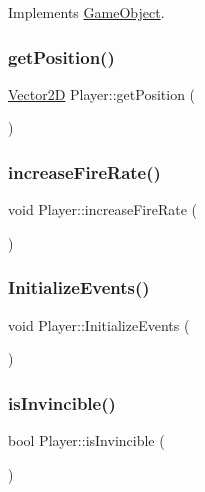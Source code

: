 Implements \hyperlink{class_game_object_a8a3c07e92775fe00baa9e661fefb224e}{Game\+Object}.

\hypertarget{class_player_a265be4030f017fed6b48136c1236d132}{}\label{class_player_a265be4030f017fed6b48136c1236d132} 
\subsubsection{\texorpdfstring{get\+Position()}{getPosition()}}
{\footnotesize\ttfamily \hyperlink{class_vector2_d}{Vector2D} Player\+::get\+Position (\begin{DoxyParamCaption}{ }\end{DoxyParamCaption})}

\hypertarget{class_player_a919823b81b304a95d9052124648e7f49}{}\label{class_player_a919823b81b304a95d9052124648e7f49} 
\subsubsection{\texorpdfstring{increase\+Fire\+Rate()}{increaseFireRate()}}
{\footnotesize\ttfamily void Player\+::increase\+Fire\+Rate (\begin{DoxyParamCaption}{ }\end{DoxyParamCaption})}

\hypertarget{class_player_a5685ccedbb647c6dc475581af3454851}{}\label{class_player_a5685ccedbb647c6dc475581af3454851} 
\subsubsection{\texorpdfstring{Initialize\+Events()}{InitializeEvents()}}
{\footnotesize\ttfamily void Player\+::\+Initialize\+Events (\begin{DoxyParamCaption}{ }\end{DoxyParamCaption})}

\hypertarget{class_player_adba050abb9918cad32f1322b567875cf}{}\label{class_player_adba050abb9918cad32f1322b567875cf} 
\subsubsection{\texorpdfstring{is\+Invincible()}{isInvincible()}}
{\footnotesize\ttfamily bool Player\+::is\+Invincible (\begin{DoxyParamCaption}{ }\end{DoxyParamCaption})}

